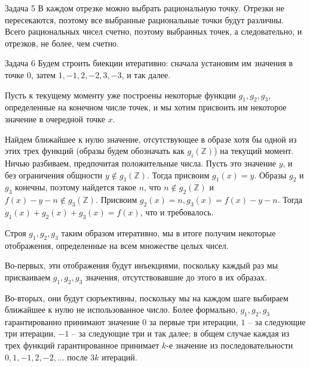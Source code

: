 \documentclass{article}
\newcommand{\Z}{\mathbb{Z}}
\begin{document}
	\begin{section}{Задача 5}
		В каждом отрезке можно выбрать рациональную точку. Отрезки не пересекаются, поэтому все выбранные рациональные точки будут различны. Всего рациональных чисел счетно, поэтому выбранных точек, а следовательно, и отрезков, не более, чем счетно.
	\end{section}

	\begin{section}{Задача 6}
		Будем строить биекции итеративно: сначала установим им значения в точке $0$, затем $1, -1, 2, -2, 3, -3$, и так далее.

		Пусть к текущему моменту уже построены некоторые функции $g_1, g_2, g_3$, определенные на конечном числе точек, и мы хотим присвоить им некоторое значение в очередной точке $x$.

		Найдем ближайшее к нулю значение, отсутствующее в образе хотя бы одной из этих трех функций (образы будем обозначать как $g_i(\Z)$) на текущий момент. Ничью разбиваем, предпочитая положительные числа. Пусть это значение $y$, и без ограничения общности $y \not\in g_1(\Z)$. Тогда присвоим $g_1(x) = y$. Образы $g_2$ и $g_3$ конечны, поэтому найдется такое $n$, что $n \not\in g_2(\Z)$ и $f(x) - y - n \not\in g_3(\Z)$. Присвоим $g_2(x) = n, g_3(x) = f(x) - y - n$. Тогда $g_1(x) + g_2(x) + g_3(x) = f(x)$, что и требовалось.

		Строя $g_1, g_2, g_3$ таким образом итеративно, мы в итоге получим некоторые отображения, определенные на всем множестве целых чисел.

		Во-первых, эти отображения будут инъекциями, поскольку каждый раз мы присваиваем $g_1, g_2, g_3$ значения, отсутствовавшие до этого в их образах.

		Во-вторых, они будут сюръективны, поскольку мы на каждом шаге выбираем ближайшее к нулю не использованное число. Более формально, $g_1, g_2, g_3$ гарантированно принимают значение $0$ за первые три итерации, $1$ -- за следующие три итерации, $-1$ -- за следующие три и так далее; в общем случае каждая из трех функций гарантированное принимает $k$-е значение из последовательности $0, 1, -1, 2, -2, \dots$ после $3k$ итераций.
	\end{section}
\end{document}

